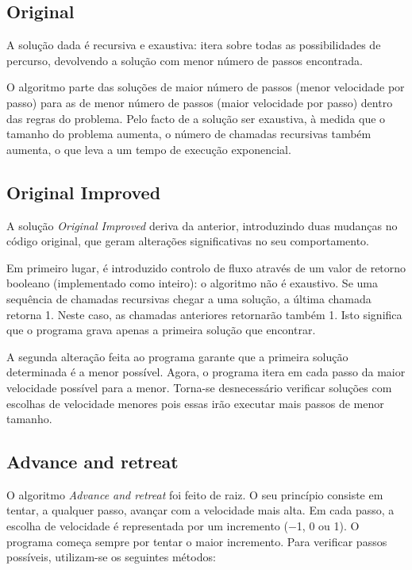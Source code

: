 \documentclass[portuguese,11pt,a4paper,titlepage]{article}
\newcommand{\foreign}[1]{\textit{#1}}
\newcommand{\srcdir}{..}
\begin{document}
\subsection{Original}
A solução dada é recursiva e exaustiva: itera sobre todas as possibilidades de
percurso, devolvendo a solução com menor número de passos encontrada.

O algoritmo parte das soluções de maior número de passos (menor velocidade por passo) para
as de menor número de passos (maior velocidade por passo) dentro das regras do problema.
Pelo facto de a solução ser exaustiva, à medida que o tamanho do problema aumenta,
o número de chamadas recursivas também aumenta, o que leva a um tempo de execução exponencial.
\subsection{Original Improved} \label{original_improved}
A solução \foreign{Original Improved} deriva da anterior, introduzindo duas mudanças no código original, que geram alterações significativas no seu comportamento.

Em primeiro lugar, é introduzido controlo de fluxo através de um valor de retorno
booleano (implementado como inteiro): o algoritmo não é exaustivo.
Se uma sequência de chamadas recursivas chegar a uma solução, a última chamada
retorna 1. 
Neste caso, as chamadas anteriores retornarão também 1.
Isto significa que o programa grava apenas a primeira solução que encontrar.

A segunda alteração feita ao programa garante que a primeira solução determinada é a
menor possível.
Agora, o programa itera em cada passo da maior velocidade possível para a menor. Torna-se
desnecessário verificar soluções com escolhas de velocidade menores pois essas irão
executar mais passos de menor tamanho.


\subsection{Advance and retreat}
O algoritmo \foreign{Advance and retreat} foi feito de raiz. O seu princípio 
consiste em tentar, a qualquer passo, avançar com a velocidade mais alta.
Em cada passo, a escolha de velocidade é representada por um incremento
($-$1, 0 ou 1). O programa começa sempre por tentar o maior incremento.
Para verificar passos possíveis, utilizam-se os seguintes métodos:
\end{document}
